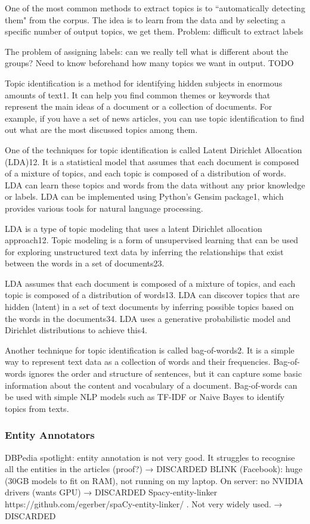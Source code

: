 One of the most common methods to extract topics is to ``automatically detecting them" from the corpus.
The idea is to learn from the data and by selecting a specific number of output topics, we get them.
Problem: difficult to extract labels

The problem of assigning labels: can we really tell what is different about the groups?
Need to know beforehand how many topics we want in output.
TODO

Topic identification is a method for identifying hidden subjects in enormous amounts of text1. It can help you find common themes or keywords that represent the main ideas of a document or a collection of documents. For example, if you have a set of news articles, you can use topic identification to find out what are the most discussed topics among them.

One of the techniques for topic identification is called Latent Dirichlet Allocation (LDA)12. It is a statistical model that assumes that each document is composed of a mixture of topics, and each topic is composed of a distribution of words. LDA can learn these topics and words from the data without any prior knowledge or labels. LDA can be implemented using Python’s Gensim package1, which provides various tools for natural language processing.

LDA is a type of topic modeling that uses a latent Dirichlet allocation approach12. Topic modeling is a form of unsupervised learning that can be used for exploring unstructured text data by inferring the relationships that exist between the words in a set of documents23.

LDA assumes that each document is composed of a mixture of topics, and each topic is composed of a distribution of words13. LDA can discover topics that are hidden (latent) in a set of text documents by inferring possible topics based on the words in the documents34. LDA uses a generative probabilistic model and Dirichlet distributions to achieve this4.

Another technique for topic identification is called bag-of-words2. It is a simple way to represent text data as a collection of words and their frequencies. Bag-of-words ignores the order and structure of sentences, but it can capture some basic information about the content and vocabulary of a document. Bag-of-words can be used with simple NLP models such as TF-IDF or Naive Bayes to identify topics from texts.


\subsubsection{Entity Annotators}
DBPedia spotlight: entity annotation is not very good. It struggles to recognise all the entities in the articles (proof?) → DISCARDED
BLINK (Facebook): huge (30GB models to fit on RAM), not running on my laptop. On server: no NVIDIA drivers (wants GPU) → DISCARDED
Spacy-entity-linker https://github.com/egerber/spaCy-entity-linker/ . Not very widely used. → DISCARDED

